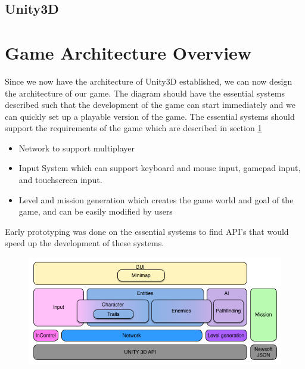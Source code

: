 \subsection{Unity3D}

\section{Game Architecture Overview}
Since we now have the architecture of Unity3D established, we can now design the architecture of our game.
The diagram should have the essential systems described such that the development of the game can start immediately and we can quickly set up a playable version of the game.
The essential systems should support the requirements of the game which are described in section \ref{} 
\begin{itemize}
	\item Network to support multiplayer
	\item Input System which can support keyboard and mouse input, gamepad input, and touchscreen input.
	\item Level and mission generation which creates the game world and goal of the game, and can be easily modified by users
\end{itemize}
Early prototyping was done on the essential systems to find API's that would speed up the development of these systems.


\begin{figure}
\includegraphics[width = \textwidth]{figures/architecture/game_architecture_overview.png}
\end{figure}

